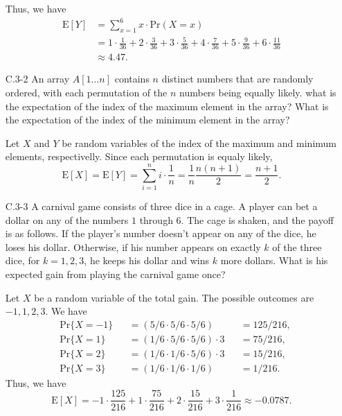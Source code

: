 \documentclass{report}
\makeatletter
\renewenvironment{framed}{%
 \def\FrameCommand##1{\hskip\@totalleftmargin
 \fboxsep=\FrameSep\fbox{##1}}%
 \MakeFramed {\advance\hsize-\width
   \@totalleftmargin\z@ \linewidth\hsize
   \@setminipage}}%
 {\par\unskip\endMakeFramed}
\makeatother
\begin{document}
\begin{enumerate}
\begin{framed}
Thus, we have
\begin{equation*}
\begin{aligned}
  \text{E}[Y] &= \sum_{x = 1}^{6} x \cdot \text{Pr}(X = x)\\
              &= 1 \cdot \frac{1}{36} + 2 \cdot \frac{3}{36} + 3 \cdot \frac{5}{36} + 4 \cdot \frac{7}{36}
               + 5 \cdot \frac{9}{36} + 6 \cdot \frac{11}{36}\\
              &\approx 4.47.
\end{aligned}
\end{equation*}

\end{framed}

\item[C.3{-}2]{An array $A[1 \dots n]$ contains $n$ distinct numbers that are
randomly ordered, with each permutation of the $n$ numbers being equally
likely. what is the expectation of the index of the maximum element in the
array? What is the expectation of the index of the minimum element in the
array?}

\begin{framed}
Let $X$ and $Y$ be random variables of the index of the maximum and minimum
elements, respectivelly. Since each permutation is equaly likely,
\[
  \text{E}[X] = \text{E}[Y] = \sum_{i = 1}^{n} i \cdot \frac{1}{n} = \frac{1}{n} \frac{n (n + 1)}{2} = \frac{n + 1}{2}.
\]
\end{framed}

\newpage

\item[C.3{-}3]{A carnival game consists of three dice in a cage. A player can
bet a dollar on any of the numbers $1$ through $6$. The cage is shaken, and
the payoff is as follows. If the player's number doesn't appear on any of
the dice, he loses his dollar. Otherwise, if his number appears on exactly
$k$ of the three dice, for $k = 1, 2, 3$, he keeps his dollar and wins $k$
more dollars. What is his expected gain from playing the carnival game
once?}

\begin{framed}
Let $X$ be a random variable of the total gain. The possible outcomes are
$-1, 1, 2, 3$. We have
\begin{equation*}
\begin{aligned}
  & \text{Pr}\{X = -1\} &&= (5/6 \cdot 5/6 \cdot 5/6)         &&= 125/216,\\
  & \text{Pr}\{X = 1\}  &&= (1/6 \cdot 5/6 \cdot 5/6) \cdot 3 &&= 75/216,\\
  & \text{Pr}\{X = 2\}  &&= (1/6 \cdot 1/6 \cdot 5/6) \cdot 3 &&= 15/216,\\
  & \text{Pr}\{X = 3\}  &&= (1/6 \cdot 1/6 \cdot 1/6)         &&= 1/216.
\end{aligned}
\end{equation*}
Thus, we have
\[
  \text{E}[X] = -1 \cdot \frac{125}{216} + 1 \cdot \frac{75}{216} + 2 \cdot \frac{15}{216} + 3 \cdot \frac{1}{216} \approx -0.0787.
\]
\end{framed}


\end{enumerate}
\end{document}
